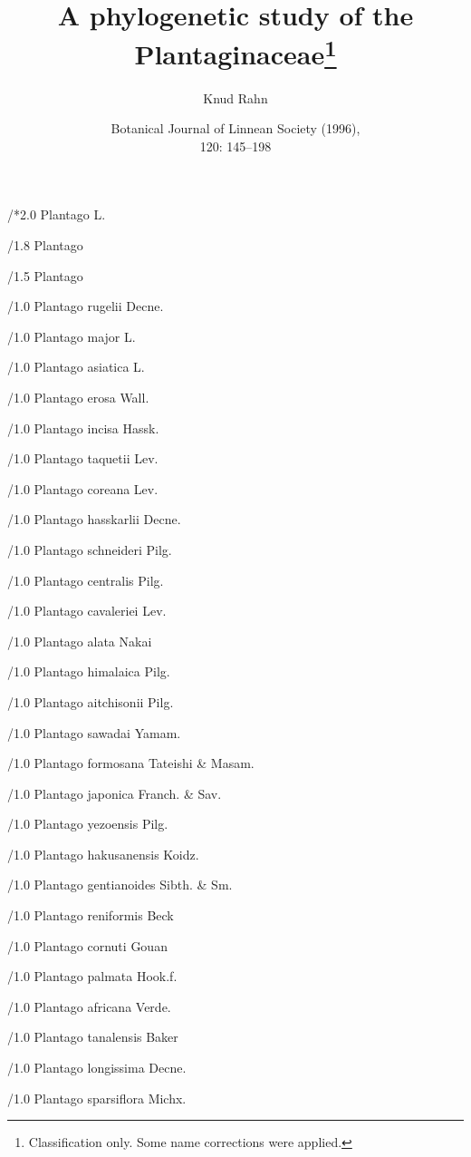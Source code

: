 \documentclass[12pt]{article}
\title{A phylogenetic study of the Plantaginaceae\thanks{Classification only. Some name corrections were applied.}}
\author{Knud Rahn}
\date{Botanical Journal of Linnean Society (1996),\\ 120: 145--198}
\begin{document}
\maketitle

\begin{classif}{1.0}

/*2.0 Plantago L.

/1.8 Plantago

/1.5 Plantago

	/1.0 {Plantago rugelii} Decne.

	/1.0 {Plantago major} L.

	/1.0 {Plantago asiatica} L.

	/1.0 {Plantago erosa} Wall.

	/1.0 {Plantago incisa} Hassk.

	/1.0 {Plantago taquetii} Lev.

	/1.0 {Plantago coreana} Lev.

	/1.0 {Plantago hasskarlii} Decne.

	/1.0 {Plantago schneideri} Pilg.

	/1.0 {Plantago centralis} Pilg.

	/1.0 {Plantago cavaleriei} Lev.

	/1.0 {Plantago alata} Nakai

	/1.0 {Plantago himalaica} Pilg.

	/1.0 {Plantago aitchisonii} Pilg.

	/1.0 {Plantago sawadai} Yamam.

	/1.0 {Plantago formosana} Tateishi \& Masam.

	/1.0 {Plantago japonica} Franch. \& Sav.

	/1.0 {Plantago yezoensis} Pilg.

	/1.0 {Plantago hakusanensis} Koidz.

	\medskip

	/1.0 {Plantago gentianoides} Sibth. \& Sm.

	/1.0 {Plantago reniformis} Beck

	/1.0 {Plantago cornuti} Gouan

	/1.0 {Plantago palmata} Hook.f.

	/1.0 {Plantago africana} Verde.

	\medskip

	/1.0 {Plantago tanalensis} Baker

	/1.0 {Plantago longissima} Decne.

	/1.0 {Plantago sparsiflora} Michx.


\end{classif}
\end{document}
